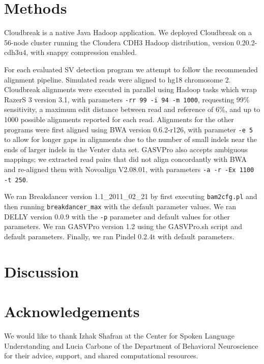 \documentclass[11pt]{article}
\begin{document}
\section{Methods}\label{discussion}

Cloudbreak is a native Java Hadoop application. We deployed Cloudbreak on a 56-node cluster running the Cloudera CDH3 Hadoop distribution, version 0.20.2-cdh3u4, with snappy compression enabled.

For each evaluated SV detection program we attempt to follow the recommended alignment pipeline. Simulated reads were aligned to hg18 chromosome 2. Cloudbreak alignments were executed in parallel using Hadoop tasks which wrap RazerS 3 version 3.1, with parameters \verb|-rr 99 -i 94 -m 1000|, requesting 99\% sensitivity, a maximum edit distance between read and reference of 6\%, and up to 1000 possible alignments reported for each read. Alignments for the other programs were first aligned using BWA \autocite{Li:2009p836} version 0.6.2-r126, with parameter \verb|-e 5| to allow for longer gaps in alignments due to the number of small indels near the ends of larger indels in the Venter data set. GASVPro also accepts ambiguous mappings; we extracted read pairs that did not align concordantly with BWA and re-aligned them with Novoalign V2.08.01, with parameters \verb|-a -r -Ex 1100 -t 250|. 

We ran Breakdancer version 1.1\_2011\_02\_21 by first executing \verb|bam2cfg.pl| and then running \verb|breakdancer_max| with the default parameter values. We ran DELLY version 0.0.9 with the \verb|-p| parameter and default values for other parameters. We ran GASVPro version 1.2 using the GASVPro.sh script and default parameters. Finally, we ran Pindel 0.2.4t with default parameters.

\section{Discussion}\label{conclusions}

\section{Acknowledgements}

We would like to thank Izhak Shafran at the Center for Spoken Language Understanding and Lucia Carbone of the Department of Behavioral Neuroscience for their advice, support, and shared computational resources.

\newpage

\printbibliography
\end{document}
